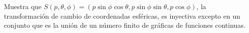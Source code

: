 Muestra que \( S(p, \theta, \phi) = (p \sin \phi \cos \theta, p \sin \phi \sin \theta, p \cos \phi) \), la transformación de cambio de coordenadas esféricas, es inyectiva excepto en un conjunto que es la unión de un número finito de gráficas de funciones continuas.

